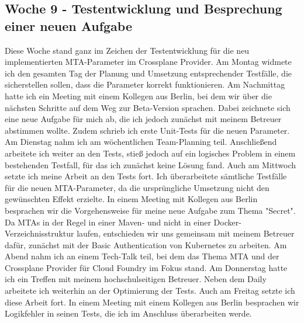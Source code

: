 \subsection{Woche 9 - Testentwicklung und Besprechung einer neuen Aufgabe}
Diese Woche stand ganz im Zeichen der Testentwicklung für die neu
implementierten MTA-Parameter im Crossplane Provider.
Am Montag widmete ich den gesamten Tag der Planung und Umsetzung
entsprechender Testfälle, die sicherstellen sollen, dass die Parameter korrekt
funktionieren. Am Nachmittag hatte ich ein Meeting mit einem Kollegen aus Berlin,
bei dem wir über die nächsten Schritte auf dem Weg zur Beta-Version sprachen.
Dabei zeichnete sich eine neue Aufgabe für mich ab, die ich jedoch zunächst mit
meinem Betreuer abstimmen wollte. Zudem schrieb ich erste Unit-Tests für die
neuen Parameter.
Am Dienstag nahm ich am wöchentlichen Team-Planning teil. Anschließend
arbeitete ich weiter an den Tests, stieß jedoch auf ein logisches Problem in einem
bestehenden Testfall, für das ich zunächst keine Lösung fand.
Auch am Mittwoch setzte ich meine Arbeit an den Tests fort. Ich überarbeitete
sämtliche Testfälle für die neuen MTA-Parameter, da die ursprüngliche Umsetzung
nicht den gewünschten Effekt erzielte. In einem Meeting mit Kollegen aus Berlin
besprachen wir die Vorgehensweise für meine neue Aufgabe zum Thema "Secret". Da
MTAs in der Regel in einer Maven- und nicht in einer Docker-Verzeichnisstruktur
laufen, entschieden wir uns gemeinsam mit meinem Betreuer dafür, zunächst mit
der Basic Authentication von Kubernetes zu arbeiten. Am Abend nahm ich an einem
Tech-Talk teil, bei dem das Thema MTA und der Crossplane Provider für Cloud
Foundry im Fokus stand.
Am Donnerstag hatte ich ein Treffen mit meinem hochschulseitigen Betreuer. Neben
dem Daily arbeitete ich weiterhin an der Optimierung der Tests. Auch am Freitag
setzte ich diese Arbeit fort. In einem Meeting mit einem Kollegen aus Berlin
besprachen wir Logikfehler in seinen Tests, die ich im Anschluss überarbeiten werde.

